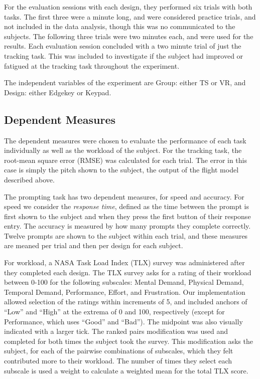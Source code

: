 For the evaluation sessions with each design, they performed six trials with both tasks.
The first three were a minute long, and were considered practice trials, and not included in the data analysis, though this was no communicated to the subjects.
The following three trials were two minutes each, and were used for the results.
Each evaluation session concluded with a two minute trial of just the tracking task.
This was included to investigate if the subject had improved or fatigued at the tracking task throughout the experiment.

The independent variables of the experiment are Group: either TS or VR, and Design: either Edgekey or Keypad.

\subsection{Dependent Measures}
\label{sec:de_dependent}

The dependent measures were chosen to evaluate the performance of each task individually as well as the workload of the subject.
For the tracking task, the root-mean square error (RMSE) was calculated for each trial.
The error in this case is simply the pitch shown to the subject, the output of the flight model described above.

The prompting task has two dependent measures, for speed and accuracy.
For speed we consider the \textit{response time}, defined as the time between the prompt is first shown to the subject and when they press the first button of their response entry.
The accuracy is measured by how many prompts they complete correctly.
Twelve prompts are shown to the subject within each trial, and these measures are meaned per trial and then per design for each subject.

For workload, a NASA Task Load Index (TLX) survey was administered after they completed each design.
The TLX survey asks for a rating of their workload between 0-100 for the following subscales: Mental Demand, Physical Demand, Temporal Demand, Performance, Effort, and Frustration.
Our implementation allowed selection of the ratings within increments of 5, and included anchors of ``Low'' and ``High'' at the extrema of 0 and 100, respectively (except for Performance, which uses ``Good'' and ``Bad'').
The midpoint was also visually indicated with a larger tick.
The ranked pairs modification was used and completed for both times the subject took the survey.
This modification asks the subject, for each of the pairwise combinations of subscales, which they felt contributed more to their workload.
The number of times they select each subscale is used a weight to calculate a weighted mean for the total TLX score.

